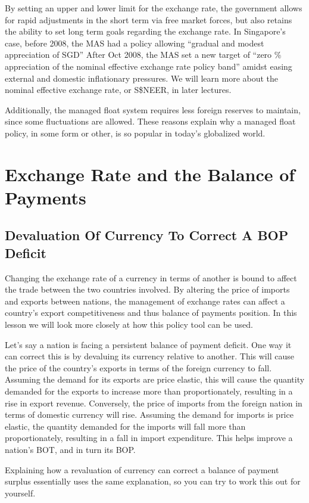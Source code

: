 \documentclass[DIV=classic,11pt,numbers=noenddot,parskip]{scrartcl}
\begin{document}
By setting an upper and lower limit for the exchange rate, the government allows for rapid adjustments in the short term via free market forces, but also retains the ability to set long term goals regarding the exchange rate. In Singapore’s case, before 2008, the MAS had a policy allowing “gradual and modest appreciation of SGD” After Oct 2008, the MAS set a new target of “zero \% appreciation of the nominal effective exchange rate policy band” amidst easing external and domestic inflationary pressures. We will learn more about the nominal effective exchange rate, or S\$NEER, in later lectures.

Additionally, the managed float system requires less foreign reserves to maintain, since some fluctuations are allowed. These reasons explain why a managed float policy, in some form or other, is so popular in today’s globalized world.
\newpage
\section{Exchange Rate and the Balance of Payments}
\subsection{Devaluation Of Currency To Correct A BOP Deficit}
Changing the exchange rate of a currency in terms of another is bound to affect the trade between the two countries involved. By altering the price of imports and exports between nations, the management of exchange rates can affect a country’s export competitiveness and thus balance of payments position. In this lesson we will look more closely at how this policy tool can be used.

Let’s say a nation is facing a persistent balance of payment deficit. One way it can correct this is by devaluing its currency relative to another. This will cause the price of the country’s exports in terms of the foreign currency to fall. Assuming the demand for its exports are price elastic, this will cause the quantity demanded for the exports to increase more than proportionately, resulting in a rise in export revenue. Conversely, the price of imports from the foreign nation in terms of domestic currency will rise. Assuming the demand for imports is price elastic, the quantity demanded for the imports will fall more than proportionately, resulting in a fall in import expenditure. This helps improve a nation’s BOT, and in turn its BOP.

Explaining how a revaluation of currency can correct a balance of payment surplus essentially uses the same explanation, so you can try to work this out for yourself.
\end{document}
